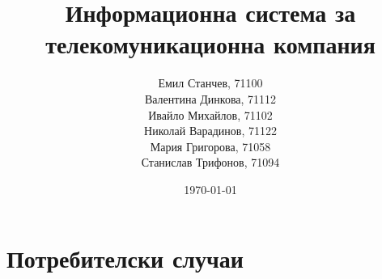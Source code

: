 \documentclass{beamer}
\title[ИС за телекомуникационна компания]{Информационна система за телекомуникационна компания}
\author{\tiny {Емил Станчев, 71100 \\
	Валентина Динкова, 71112 \\
	Ивайло Михайлов, 71102 \\
	Николай Варадинов, 71122 \\
	Мария Григорова, 71058 \\
	Станислав Трифонов, 71094 
	}
	}
\institute{ФМИ}
\date{\tiny{\today}}
\begin{document}
\begin{frame}
  \titlepage
\end{frame}

\section{Потребителски случаи}








\end{document}
